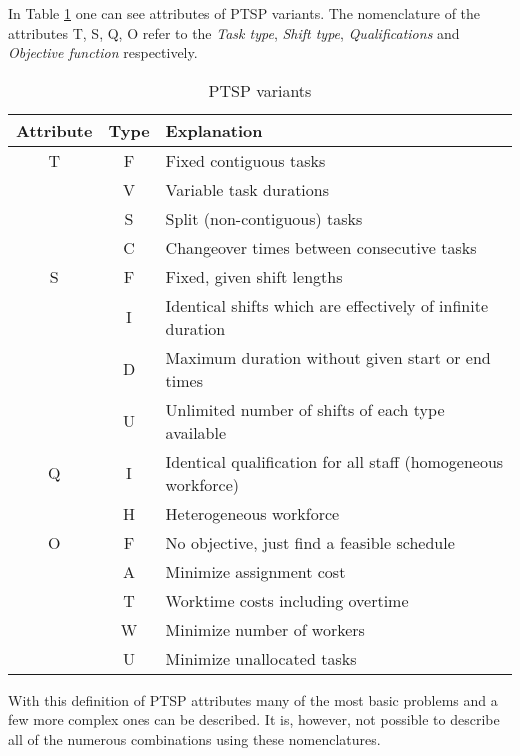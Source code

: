 In Table \ref{PTSP} one can see attributes of PTSP variants. The nomenclature of the attributes T, S, Q, O refer to the \textit{Task type}, \textit{Shift type}, \textit{Qualifications} and \textit{Objective function} respectively. 
\begin{table}[H]
\caption{PTSP variants}
\label{PTSP}
\begin{tabular}{|c|c|l|}
\hline
\textbf{Attribute} & \textbf{Type} & \textbf{Explanation} \\ \hline
T & F & Fixed contiguous tasks \\
& V & Variable task durations \\
& S & Split (non-contiguous) tasks \\
& C & Changeover times between consecutive tasks \\
\hline 
S & F & Fixed, given shift lengths \\
& I & Identical shifts which are effectively of infinite duration \\
& D & Maximum duration without given start or end times \\
& U & Unlimited number of shifts of each type available \\
\hline 
Q & I & Identical qualification for all staff (homogeneous workforce) \\
& H & Heterogeneous workforce \\
\hline 
O & F & No objective, just find a feasible schedule \\
& A & Minimize assignment cost \\
& T & Worktime costs including overtime \\
& W & Minimize number of workers \\
& U & Minimize unallocated tasks \\
\hline  

\end{tabular}
\end{table}

With this definition of PTSP attributes many of the most basic problems and a few more complex ones can be described. It is, however, not possible to describe all of the numerous combinations using these nomenclatures.

